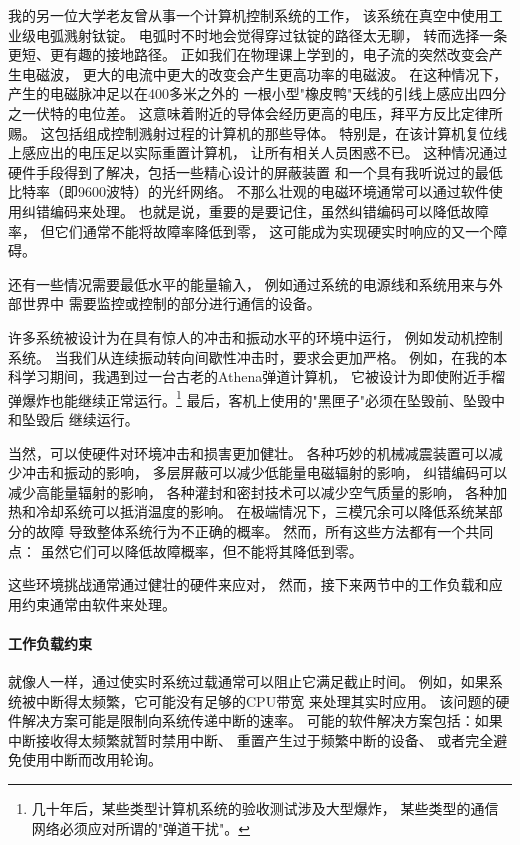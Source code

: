 我的另一位大学老友曾从事一个计算机控制系统的工作，
该系统在真空中使用工业级电弧溅射钛锭。
电弧时不时地会觉得穿过钛锭的路径太无聊，
转而选择一条更短、更有趣的接地路径。
正如我们在物理课上学到的，电子流的突然改变会产生电磁波，
更大的电流中更大的改变会产生更高功率的电磁波。
在这种情况下，产生的电磁脉冲足以在400多米之外的
一根小型"橡皮鸭"天线的引线上感应出四分之一伏特的电位差。
这意味着附近的导体会经历更高的电压，拜平方反比定律所赐。
这包括组成控制溅射过程的计算机的那些导体。
特别是，在该计算机复位线上感应出的电压足以实际重置计算机，
让所有相关人员困惑不已。
这种情况通过硬件手段得到了解决，包括一些精心设计的屏蔽装置
和一个具有我听说过的最低比特率（即9600波特）的光纤网络。
不那么壮观的电磁环境通常可以通过软件使用纠错编码来处理。
也就是说，重要的是要记住，虽然纠错编码可以降低故障率，
但它们通常不能将故障率降低到零，
这可能成为实现硬实时响应的又一个障碍。

还有一些情况需要最低水平的能量输入，
例如通过系统的电源线和系统用来与外部世界中
需要监控或控制的部分进行通信的设备。

\QuickQuizEnd

许多系统被设计为在具有惊人的冲击和振动水平的环境中运行，
例如发动机控制系统。
当我们从连续振动转向间歇性冲击时，要求会更加严格。
例如，在我的本科学习期间，我遇到过一台古老的Athena弹道计算机，
它被设计为即使附近手榴弹爆炸也能继续正常运行。\footnote{
	几十年后，某些类型计算机系统的验收测试涉及大型爆炸，
	某些类型的通信网络必须应对所谓的"弹道干扰"。}
最后，客机上使用的"黑匣子"必须在坠毁前、坠毁中和坠毁后
继续运行。

当然，可以使硬件对环境冲击和损害更加健壮。
各种巧妙的机械减震装置可以减少冲击和振动的影响，
多层屏蔽可以减少低能量电磁辐射的影响，
纠错编码可以减少高能量辐射的影响，
各种灌封和密封技术可以减少空气质量的影响，
各种加热和冷却系统可以抵消温度的影响。
在极端情况下，三模冗余可以降低系统某部分的故障
导致整体系统行为不正确的概率。
然而，所有这些方法都有一个共同点：
虽然它们可以降低故障概率，但不能将其降低到零。

这些环境挑战通常通过健壮的硬件来应对，
然而，接下来两节中的工作负载和应用约束通常由软件来处理。

\paragraph{工作负载约束}
\label{sec:advsync:Workload Constraints}

就像人一样，通过使实时系统过载通常可以阻止它满足截止时间。
例如，如果系统被中断得太频繁，它可能没有足够的CPU带宽
来处理其实时应用。
该问题的硬件解决方案可能是限制向系统传递中断的速率。
可能的软件解决方案包括：如果中断接收得太频繁就暂时禁用中断、
重置产生过于频繁中断的设备、
或者完全避免使用中断而改用轮询。

